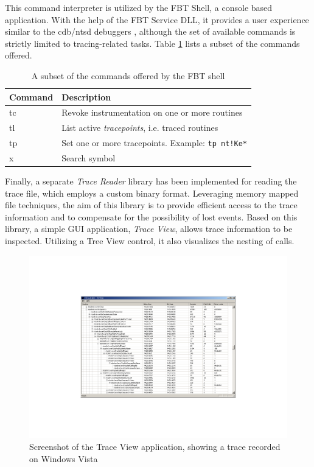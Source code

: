 This command interpreter is utilized by the FBT Shell, a console based application.
With the help of the FBT Service DLL, it provides a user experience similar to the
cdb/ntsd debuggers \cite{WinDbg}, although the set of available commands is strictly limited to 
tracing-related tasks. Table \ref{FbtCommands} lists a subset of the commands offered.

\begin{table}[h] 
\caption{A subset of the commands offered by the FBT shell}
\label{FbtCommands}
\centering          
\begin{tabular}{l l}    
\hline\hline 
Command & Description	\\
\hline
tc		& Revoke instrumentation on one or more routines	\\
tl		& List active \emph{tracepoints}, i.e. traced routines\\
tp		& Set one or more tracepoints. Example: \verb|tp nt!Ke*| \\
x			& Search symbol	\\
\hline
\end{tabular}
\end{table}

Finally, a separate \emph{Trace Reader} library has been implemented for reading the 
trace file, which employs a custom binary format.
Leveraging memory mapped file techniques, the aim of this library is to provide
efficient access to the trace information and to compensate for the possibility
of lost events. Based on this library, a simple GUI application, \emph{Trace View},
allows trace information to be inspected. Utilizing a Tree View control, it also visualizes
the nesting of calls.

\begin{figure}[h] 
\begin{centering} 
\includegraphics[scale=0.8, clip=true, viewport=5.9cm 4cm 24cm 17cm]{images/TrcViewScreenshot.pdf} 
\caption[Screenshot of the Trace View application]{Screenshot of the Trace View application, showing a trace recorded on Windows Vista} 
\label{TrcViewScreenshot} 
\end{centering} 
\end{figure}



